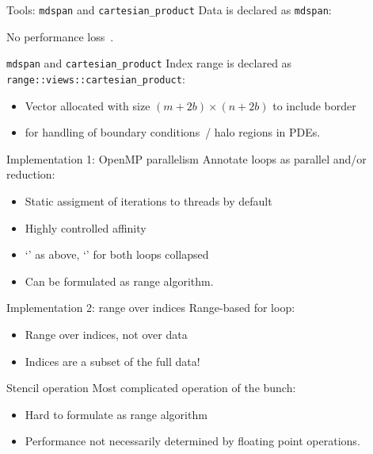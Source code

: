 \documentclass[10pt,t]{beamer}
\begin{document}
\begin{frame}[containsverbatim]{Tools: \texttt{mdspan} and \texttt{cartesian\_product}}
  Data is declared as \lstinline{mdspan}:
  \begin{multicols}{2}
  \columnbreak
  \end{multicols}

  No performance loss~\cite{Hollman:mdspan}.
\end{frame}

\begin{frame}[containsverbatim]{\texttt{mdspan} and \texttt{cartesian\_product}}
  Index range is declared as \lstinline{range::views::cartesian_product}:
  \begin{itemize}
  \item Vector allocated with size $(m+2b)\times(n+2b)$ to include border
  \item for handling of boundary conditions~/ halo regions in PDEs.
  \end{itemize}
\end{frame}

\begin{frame}[containsverbatim]{Implementation 1: OpenMP parallelism}
  Annotate loops as parallel and/or reduction:
  \begin{itemize}
  \item Static assigment of iterations to threads by default
  \item Highly controlled affinity
  \item `' as above, `' for both loops collapsed
  \item Can be formulated as range algorithm.
  \end{itemize}
\end{frame}

\begin{frame}[containsverbatim]{Implementation 2: range over indices}
  Range-based for loop:
  \begin{itemize}
  \item Range over indices, not over data
  \item Indices are a subset of the full data!
  \end{itemize}
\end{frame}

\begin{frame}[containsverbatim]{Stencil operation}
  Most complicated operation of the bunch:
  \begin{itemize}
  \item Hard to formulate as range algorithm
  \item Performance not necessarily determined by floating point operations.
  \end{itemize}
\end{frame}
\end{document}
